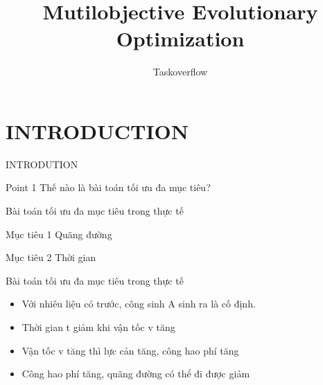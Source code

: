 \documentclass{beamer}
\title{Mutilobjective Evolutionary Optimization}
\author{Taskoverflow}
\begin{document}
\maketitle 

\section[Outline]{}
\begin{frame}   
    \tableofcontents
\end{frame}



    \section{INTRODUCTION}
    \begin{frame}{INTRODUTION}
        \begin{block}{Point 1}
            Thế nào là bài toán tối ưu đa mục tiêu?
        \end{block}
    \end{frame}
    \begin{frame}{Bài toán tối ưu đa mục tiêu trong thực tế}
        \begin{block}{Mục tiêu 1}
            Quãng đường
        \end{block}
        \begin{block}{Mục tiêu 2}
            Thời gian
        \end{block}
    \end{frame}
    \begin{frame}{Bài toán tối ưu đa mục tiêu trong thực tế}
        \begin{itemize}
            \item <1-> Với nhiêu liệu có trước, công sinh A sinh ra là cố định.
            \item <2-> Thời gian t giảm khi vận tốc v tăng
            \item <3-> Vận tốc v tăng thì lực cản tăng, công hao phí tăng 
            \item <4-> Công hao phí tăng, quãng đường có thể đi được giảm
        \end{itemize}
    \end{frame}
\end{document}

